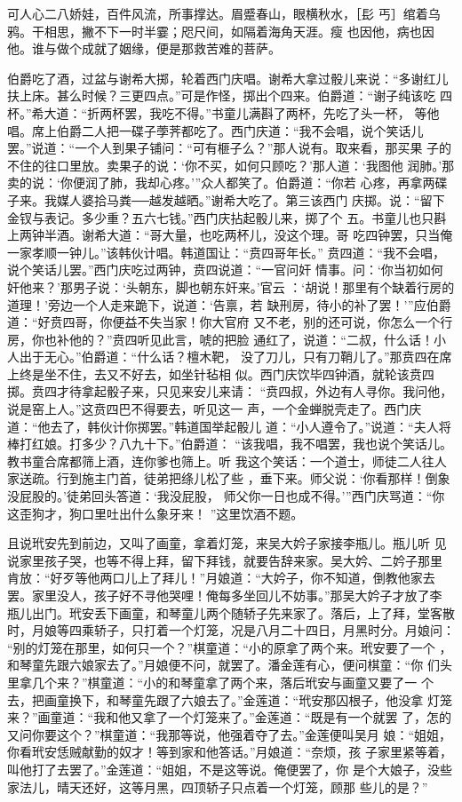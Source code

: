 可人心二八娇娃，百件风流，所事撑达。眉蹙春山，眼横秋水，［髟
丐］绾着乌鸦。干相思，撇不下一时半霎；咫尺间，如隔着海角天涯。瘦
也因他，病也因他。谁与做个成就了姻缘，便是那救苦难的菩萨。

伯爵吃了酒，过盆与谢希大掷，轮着西门庆唱。谢希大拿过骰儿来说：“多谢红儿
扶上床。甚么时候？三更四点。”可是作怪，掷出个四来。伯爵道：“谢子纯该吃
四杯。”希大道：“折两杯罢，我吃不得。”书童儿满斟了两杯，先吃了头一杯，
等他唱。席上伯爵二人把一碟子荸荠都吃了。西门庆道：“我不会唱，说个笑话儿
罢。”说道：“一个人到果子铺问：“可有榧子么？”那人说有。取来看，那买果
子的不住的往口里放。卖果子的说：‘你不买，如何只顾吃？’那人道：‘我图他
润肺。’那卖的说：‘你便润了肺，我却心疼。’”众人都笑了。伯爵道：“你若
心疼，再拿两碟子来。我媒人婆拾马粪──越发越晒。”谢希大吃了。第三该西门
庆掷。说：“留下金钗与表记。多少重？五六七钱。”西门庆拈起骰儿来，掷了个
五。书童儿也只斟上两钟半酒。谢希大道：“哥大量，也吃两杯儿，没这个理。哥
吃四钟罢，只当俺一家孝顺一钟儿。”该韩伙计唱。韩道国让：“贲四哥年长。”
贲四道：“我不会唱，说个笑话儿罢。”西门庆吃过两钟，贲四说道：“一官问奸
情事。问：‘你当初如何奸他来？’那男子说：‘头朝东，脚也朝东奸来。’官云
：‘胡说！那里有个缺着行房的道理！’旁边一个人走来跪下，说道：‘告禀，若
缺刑房，待小的补了罢！’”应伯爵道：“好贲四哥，你便益不失当家！你大官府
又不老，别的还可说，你怎么一个行房，你也补他的？”贲四听见此言，唬的把脸
通红了，说道：“二叔，什么话！小人出于无心。”伯爵道：“什么话？檀木靶，
没了刀儿，只有刀鞘儿了。”那贲四在席上终是坐不住，去又不好去，如坐针毡相
似。西门庆饮毕四钟酒，就轮该贲四掷。贲四才待拿起骰子来，只见来安儿来请：
“贲四叔，外边有人寻你。我问他，说是窑上人。”这贲四巴不得要去，听见这一
声，一个金蝉脱壳走了。西门庆道：“他去了，韩伙计你掷罢。”韩道国举起骰儿
道：“小人遵令了。”说道：“夫人将棒打红娘。打多少？八九十下。”伯爵道：
“该我唱，我不唱罢，我也说个笑话儿。教书童合席都筛上酒，连你爹也筛上。听
我这个笑话：一个道士，师徒二人往人家送疏。行到施主门首，徒弟把绦儿松了些
，垂下来。师父说：‘你看那样！倒象没屁股的。’徒弟回头答道：‘我没屁股，
师父你一日也成不得。’”西门庆骂道：“你这歪狗才，狗口里吐出什么象牙来！
”这里饮酒不题。

且说玳安先到前边，又叫了画童，拿着灯笼，来吴大妗子家接李瓶儿。瓶儿听
见说家里孩子哭，也等不得上拜，留下拜钱，就要告辞来家。吴大妗、二妗子那里
肯放：“好歹等他两口儿上了拜儿！”月娘道：“大妗子，你不知道，倒教他家去
罢。家里没人，孩子好不寻他哭哩！俺每多坐回儿不妨事。”那吴大妗子才放了李
瓶儿出门。玳安丢下画童，和琴童儿两个随轿子先来家了。落后，上了拜，堂客散
时，月娘等四乘轿子，只打着一个灯笼，况是八月二十四日，月黑时分。月娘问：
“别的灯笼在那里，如何只一个？”棋童道：“小的原拿了两个来。玳安要了一个
，和琴童先跟六娘家去了。”月娘便不问，就罢了。潘金莲有心，便问棋童：“你
们头里拿几个来？”棋童道：“小的和琴童拿了两个来，落后玳安与画童又要了一
个去，把画童换下，和琴童先跟了六娘去了。”金莲道：“玳安那囚根子，他没拿
灯笼来？”画童道：“我和他又拿了一个灯笼来了。”金莲道：“既是有一个就罢
了，怎的又问你要这个？”棋童道：“我那等说，他强着夺了去。”金莲便叫吴月
娘：“姐姐，你看玳安恁贼献勤的奴才！等到家和他答话。”月娘道：“奈烦，孩
子家里紧等着，叫他打了去罢了。”金莲道：“姐姐，不是这等说。俺便罢了，你
是个大娘子，没些家法儿，晴天还好，这等月黑，四顶轿子只点着一个灯笼，顾那
些儿的是？”

